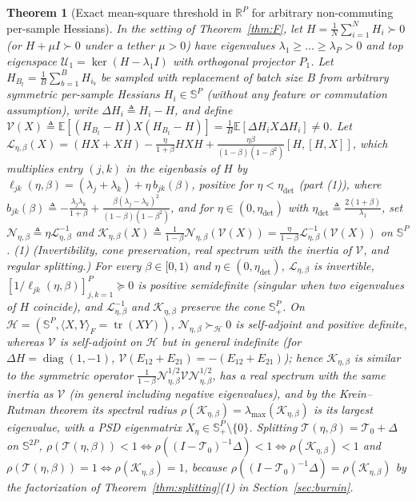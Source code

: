 \documentclass[11pt]{article}
\newtheorem{theorem}{Theorem}
\theoremstyle{remark}
\newcommand{\E}{\mathbb{E}}
\newcommand{\R}{\mathbb{R}}
\newcommand{\tr}{\operatorname{tr}}
\begin{document}
\begin{theorem}[Exact mean-square threshold in $\R^P$ for arbitrary non-commuting per-sample Hessians]\label{thm:G6}
In the setting of Theorem~\ref{thm:F}, let $H=\frac1N\sum_{i=1}^NH_i\succ0$ (or $H+\mu I\succ0$ under a tether $\mu>0$) have eigenvalues $\lambda_1\ge\dots\ge\lambda_P>0$ and top eigenspace $\mathcal U_1=\ker(H-\lambda_1I)$ with orthogonal projector $P_1$. Let $H_{B_t}=\frac1B\sum_{b=1}^BH_{i_b}$ be sampled with replacement of batch size $B$ from arbitrary symmetric per-sample Hessians $H_i\in\mathbb S^P$ (without any feature or commutation assumption), write $\Delta H_i\triangleq H_i-H$, and define $\mathcal V(X)\triangleq\E[(H_{B_t}-H)X(H_{B_t}-H)]=\frac1B\E[\Delta H_iX\Delta H_i]\ne0$. Let $\mathcal L_{\eta,\beta}(X)=(HX+XH)-\frac{\eta}{1+\beta}HXH+\frac{\eta\beta}{(1-\beta)(1-\beta^2)}[H,[H,X]]$, which multiplies entry $(j,k)$ in the eigenbasis of $H$ by $\ell_{jk}(\eta,\beta)=(\lambda_j+\lambda_k)+\eta\,b_{jk}(\beta)$, positive for $\eta<\eta_{\mathrm{det}}$ (part (1)), where $b_{jk}(\beta)\triangleq-\frac{\lambda_j\lambda_k}{1+\beta}+\frac{\beta(\lambda_j-\lambda_k)^2}{(1-\beta)(1-\beta^2)}$, and for $\eta\in(0,\eta_{\mathrm{det}})$ with $\eta_{\mathrm{det}}\triangleq\frac{2(1+\beta)}{\lambda_1}$, set $\mathcal N_{\eta,\beta}\triangleq\eta\mathcal L_{\eta,\beta}^{-1}$ and $\mathcal K_{\eta,\beta}(X)\triangleq\frac1{1-\beta}\mathcal N_{\eta,\beta}(\mathcal V(X))=\frac{\eta}{1-\beta}\mathcal L_{\eta,\beta}^{-1}(\mathcal V(X))$ on $\mathbb S^P$.
(1) \emph{(Invertibility, cone preservation, real spectrum with the inertia of $\mathcal V$, and regular splitting.)} For every $\beta\in[0,1)$ and $\eta\in(0,\eta_{\mathrm{det}})$, $\mathcal L_{\eta,\beta}$ is invertible, $[1/\ell_{jk}(\eta,\beta)]_{j,k=1}^P\succeq0$ is positive semidefinite (singular when two eigenvalues of $H$ coincide), and $\mathcal L_{\eta,\beta}^{-1}$ and $\mathcal K_{\eta,\beta}$ preserve the cone $\mathbb S_+^P$. On $\mathcal H=(\mathbb S^P,\langle X,Y\rangle_F=\tr(XY))$, $\mathcal N_{\eta,\beta}\succ_{\mathcal H}0$ is self-adjoint and positive definite, whereas $\mathcal V$ is self-adjoint on $\mathcal H$ but in general indefinite (for $\Delta H=\operatorname{diag}(1,-1)$, $\mathcal V(E_{12}+E_{21})=-(E_{12}+E_{21})$); hence $\mathcal K_{\eta,\beta}$ is similar to the symmetric operator $\frac1{1-\beta}\mathcal N_{\eta,\beta}^{1/2}\mathcal V\mathcal N_{\eta,\beta}^{1/2}$, has a real spectrum with the same inertia as $\mathcal V$ (in general including negative eigenvalues), and by the Krein--Rutman theorem \citep{krein1948linear} its spectral radius $\rho(\mathcal K_{\eta,\beta})=\lambda_{\max}(\mathcal K_{\eta,\beta})$ is its largest eigenvalue, with a PSD eigenmatrix $X_\eta\in\mathbb S_+^P\setminus\{0\}$. Splitting $\mathcal T(\eta,\beta)=\mathcal T_0+\Delta$ on $\mathbb S^{2P}$, $\rho(\mathcal T(\eta,\beta))<1\iff\rho((I-\mathcal T_0)^{-1}\Delta)<1\iff\rho(\mathcal K_{\eta,\beta})<1$ and $\rho(\mathcal T(\eta,\beta))=1\iff\rho(\mathcal K_{\eta,\beta})=1$, because $\rho((I-\mathcal T_0)^{-1}\Delta)=\rho(\mathcal K_{\eta,\beta})$ by the factorization of Theorem~\ref{thm:splitting}(1) in Section~\ref{sec:burnin}.

\end{theorem}
\end{document}
